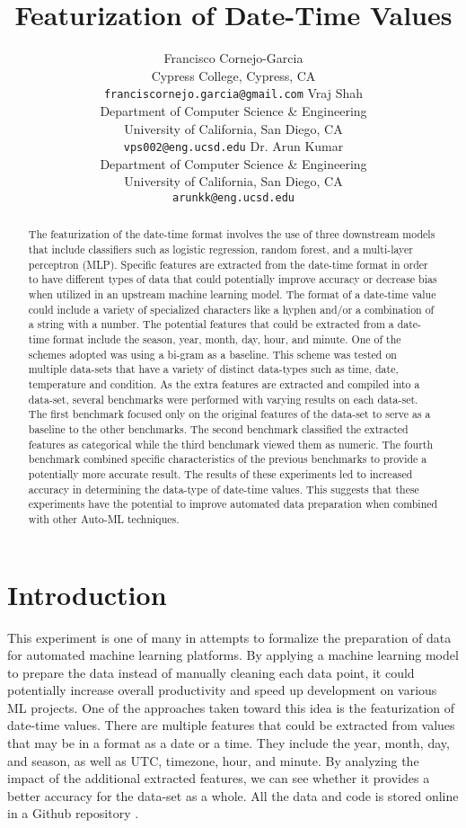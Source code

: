 \documentclass{article}
\title{Featurization of Date-Time Values}
\author{
  Francisco Cornejo-Garcia \\ Cypress College, Cypress, CA \\
  \texttt{franciscornejo.garcia@gmail.com} \And
  Vraj Shah \\
  Department of Computer Science \& Engineering \\ University of California, San Diego, CA \\
  \texttt{vps002@eng.ucsd.edu} \And
  Dr. Arun Kumar \\
  Department of Computer Science \& Engineering \\ University of California, San Diego, CA \\
  \texttt{arunkk@eng.ucsd.edu}
}
\begin{document}
\maketitle
\begin{abstract}
The featurization of the date-time format involves the use of three downstream models that include classifiers such as logistic regression, random forest, and a multi-layer perceptron (MLP). Specific features are extracted from the date-time format in order to have different types of data that could potentially improve accuracy or decrease bias when utilized in an upstream machine learning model. The format of a date-time value could include a variety of specialized characters like a hyphen and/or a combination of a string with a number. The potential features that could be extracted from a date-time format include the season, year, month, day, hour, and minute. One of the schemes adopted was using a bi-gram as a baseline. This scheme was tested on multiple data-sets that have a variety of distinct data-types such as time, date, temperature and condition. As the extra features are extracted and compiled into a data-set, several benchmarks were performed with varying results on each data-set. The first benchmark focused only on the original features of the data-set to serve as a baseline to the other benchmarks. The second benchmark classified the extracted features as categorical while the third benchmark viewed them as numeric. The fourth benchmark combined specific characteristics of the previous benchmarks to provide a potentially more accurate result. The results of these experiments led to increased accuracy in determining the data-type of date-time values. This suggests that these experiments have the potential to improve automated data preparation when combined with other Auto-ML techniques.
\end{abstract}

\section{Introduction}
This experiment is one of many in attempts to formalize the preparation of data for automated machine learning platforms. By applying a machine learning model to prepare the data instead of manually cleaning each data point, it could potentially increase overall productivity and speed up development on various ML projects. One of the approaches taken toward this idea is the featurization of date-time values. There are multiple features that could be extracted from values that may be in a format as a date or a time. They include the year, month, day, and season, as well as UTC, timezone, hour, and minute. By analyzing the impact of the additional extracted features, we can see whether it provides a better accuracy for the data-set as a whole. All the data and code is stored online in a Github repository \cite{MLDataPrepZoo}.
\end{document}

